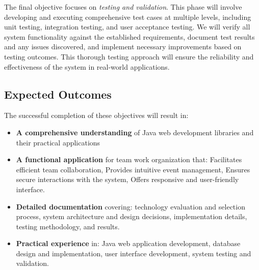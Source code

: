 The final objective focuses on \textit{testing and validation}.
This phase will involve developing and executing comprehensive test cases at multiple levels, including unit testing, integration testing, and user acceptance testing.
We will verify all system functionality against the established requirements, document test results and any issues discovered, and implement necessary improvements based on testing outcomes.
This thorough testing approach will ensure the reliability and effectiveness of the system in real-world applications.
\newpage
\subsection{Expected Outcomes}\label{subsec:expected-outcomes}
The successful completion of these objectives will result in:

\begin{itemize}
    \item \textbf{A comprehensive understanding} of Java web development libraries and their practical applications

    \item \textbf{A functional application} for team work organization that:
    Facilitates efficient team collaboration,
    Provides intuitive event management,
    Ensures secure interactions with the system,
    Offers responsive and user-friendly interface.


    \item \textbf{Detailed documentation} covering: technology evaluation and selection process,
    system architecture and design decisions,
    implementation details, testing methodology, and results.


    \item \textbf{Practical experience} in: Java web application development,
    database design and implementation,
    user interface development,
    system testing and validation.
\end{itemize}
